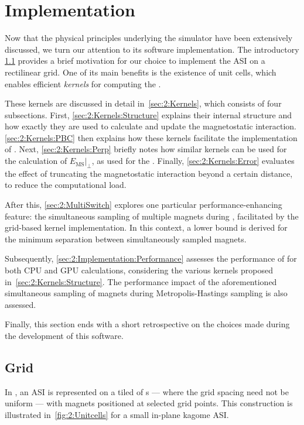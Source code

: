\newpage
\section{Implementation}\label{sec:2:Implementation}
Now that the physical principles underlying the simulator have been extensively discussed, we turn our attention to its software implementation.
The introductory \cref{sec:2:Implementation:Grid} provides a brief motivation for our choice to implement the ASI on a rectilinear grid.
One of its main benefits is the existence of unit cells, which enables efficient \textit{kernels} for computing the . \par
These kernels are discussed in detail in~\cref{sec:2:Kernels}, which consists of four subsections.
First, \cref{sec:2:Kernels:Structure} explains their internal structure and how exactly they are used to calculate and update the magnetostatic interaction.
\cref{sec:2:Kernels:PBC} then explains how these kernels facilitate the implementation of .
Next, \cref{sec:2:Kernels:Perp} briefly notes how similar kernels can be used for the calculation of $\left. E_{\mathrm{MS}} \right|_{\perp}$, as used for the .
Finally, \cref{sec:2:Kernels:Error} evaluates the effect of truncating the magnetostatic interaction beyond a certain distance, to reduce the computational load. \par
After this, \cref{sec:2:MultiSwitch} explores one particular performance-enhancing feature: the simultaneous sampling of multiple magnets during , facilitated by the grid-based kernel implementation.
In this context, a lower bound is derived for the minimum separation between simultaneously sampled magnets. \par
Subsequently, \cref{sec:2:Implementation:Performance} assesses the performance of \hotspice for both CPU and GPU calculations, considering the various kernels proposed in~\cref{sec:2:Kernels:Structure}.
The performance impact of the aforementioned simultaneous sampling of magnets during Metropolis-Hastings sampling is also assessed. \par
Finally, this section ends with a short retrospective on the choices made during the development of this software.

\subsection{Grid}\label{sec:2:Implementation:Grid}
In \hotspice, an ASI is represented on a tiled  of s --- where the grid spacing need not be uniform --- with magnets positioned at selected grid points.
This construction is illustrated in~\cref{fig:2:Unitcells} for a small in-plane kagome ASI.

